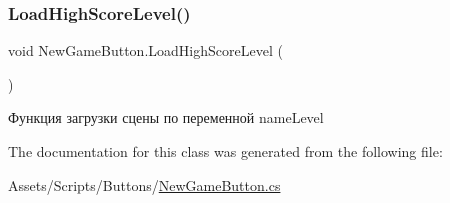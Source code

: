 \subsubsection{\texorpdfstring{Load\+High\+Score\+Level()}{LoadHighScoreLevel()}}
{\footnotesize\ttfamily void New\+Game\+Button.\+Load\+High\+Score\+Level (\begin{DoxyParamCaption}{ }\end{DoxyParamCaption})\hspace{0.3cm}{\ttfamily [inline]}}



Функция загрузки сцены по переменной name\+Level 



The documentation for this class was generated from the following file\+:\begin{DoxyCompactItemize}
\item 
Assets/\+Scripts/\+Buttons/\mbox{\hyperlink{_new_game_button_8cs}{New\+Game\+Button.\+cs}}\end{DoxyCompactItemize}
